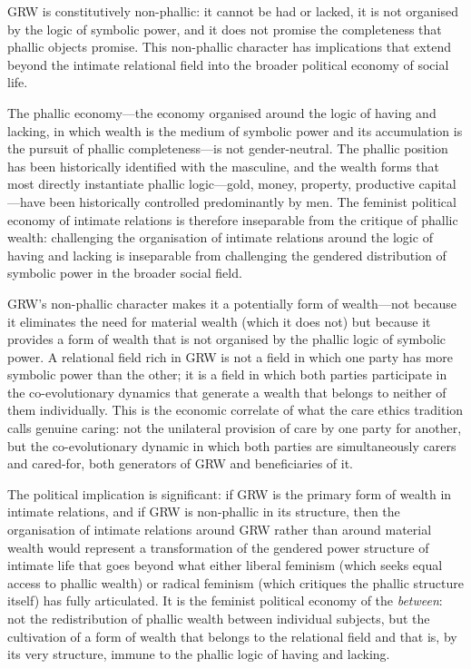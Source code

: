 \noindent
GRW is constitutively non-phallic: it cannot be had or lacked, it is not organised by the logic of symbolic power, and it does not promise the completeness that phallic objects promise. This non-phallic character has implications that extend beyond the intimate relational field into the broader political economy of social life.

The phallic economy---the economy organised around the logic of having and lacking, in which wealth is the medium of symbolic power and its accumulation is the pursuit of phallic completeness---is not gender-neutral. The phallic position has been historically identified with the masculine, and the wealth forms that most directly instantiate phallic logic---gold, money, property, productive capital---have been historically controlled predominantly by men. The feminist political economy of intimate relations is therefore inseparable from the critique of phallic wealth: challenging the organisation of intimate relations around the logic of having and lacking is inseparable from challenging the gendered distribution of symbolic power in the broader social field.

GRW's non-phallic character makes it a potentially  form of wealth---not because it eliminates the need for material wealth (which it does not) but because it provides a form of wealth that is not organised by the phallic logic of symbolic power. A relational field rich in GRW is not a field in which one party has more symbolic power than the other; it is a field in which both parties participate in the co-evolutionary dynamics that generate a wealth that belongs to neither of them individually. This is the economic correlate of what the care ethics tradition calls genuine caring: not the unilateral provision of care by one party for another, but the co-evolutionary dynamic in which both parties are simultaneously carers and cared-for, both generators of GRW and beneficiaries of it.

The political implication is significant: if GRW is the primary form of wealth in intimate relations, and if GRW is non-phallic in its structure, then the organisation of intimate relations around GRW rather than around material wealth would represent a transformation of the gendered power structure of intimate life that goes beyond what either liberal feminism (which seeks equal access to phallic wealth) or radical feminism (which critiques the phallic structure itself) has fully articulated. It is the feminist political economy of the \emph{between}: not the redistribution of phallic wealth between individual subjects, but the cultivation of a form of wealth that belongs to the relational field and that is, by its very structure, immune to the phallic logic of having and lacking.

